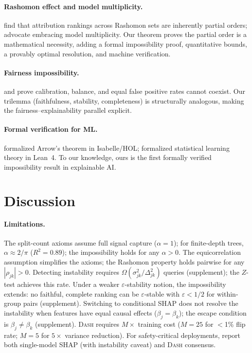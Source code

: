 \documentclass{article}
\newcommand{\DASH}{\textsc{Dash}}
\begin{document}
\paragraph{Rashomon effect and model multiplicity.}
\citet{laberge2023partial} find that attribution rankings across Rashomon sets are inherently partial orders; \citet{rudin2024amazing} advocate embracing model multiplicity.
Our theorem proves the partial order is a mathematical necessity, adding a formal impossibility proof, quantitative bounds, a provably optimal resolution, and machine verification.

\paragraph{Fairness impossibility.}
\citet{chouldechova2017fair} and \citet{kleinberg2017inherent} prove calibration, balance, and equal false positive rates cannot coexist.
Our trilemma (faithfulness, stability, completeness) is structurally analogous, making the fairness--explainability parallel explicit.

\paragraph{Formal verification for ML.}
\citet{nipkow2009social} formalized Arrow's theorem in Isabelle/HOL; \citet{zhang2026statistical} formalized statistical learning theory in Lean~4. To our knowledge, ours is the first formally verified impossibility result in explainable AI.

\section{Discussion}
\label{sec:discussion}

\paragraph{Limitations.}
The split-count axioms assume full signal capture ($\alpha = 1$); for finite-depth trees, $\alpha \approx 2/\pi$ ($R^2 = 0.89$); the impossibility holds for any $\alpha > 0$.
The equicorrelation assumption simplifies the axioms; the Rashomon property holds pairwise for any $|\rho_{jk}| > 0$.
Detecting instability requires $\Omega(\sigma^2_{jk}/\Delta^2_{jk})$ queries (supplement); the $Z$-test achieves this rate.
Under a weaker $\varepsilon$-stability notion, the impossibility extends: no faithful, complete ranking can be $\varepsilon$-stable with $\varepsilon < 1/2$ for within-group pairs (supplement).
Switching to conditional SHAP \citep{janzing2020feature} does not resolve the instability when features have equal causal effects ($\beta_j = \beta_k$); the escape condition is $\beta_j \neq \beta_k$ (supplement).
\DASH{} requires $M\times$ training cost ($M{=}25$ for $<$1\% flip rate; $M{=}5$ for $5\times$ variance reduction).
For safety-critical deployments, report both single-model SHAP (with instability caveat) and \DASH{} consensus.
\end{document}
